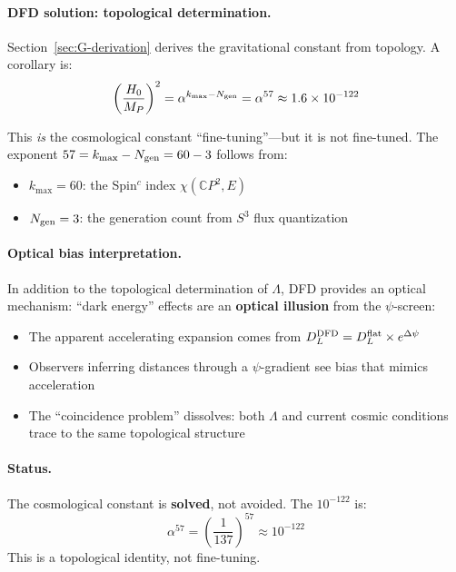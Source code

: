 \paragraph{DFD solution: topological determination.}
Section~\ref{sec:G-derivation} derives the gravitational constant from topology. A corollary is:
\begin{equation}
\left(\frac{H_0}{M_P}\right)^2 = \alpha^{k_{\max} - N_{\rm gen}} = \alpha^{57} \approx 1.6 \times 10^{-122}
\end{equation}

This \textit{is} the cosmological constant ``fine-tuning''---but it is not fine-tuned. The exponent $57 = k_{\max} - N_{\rm gen} = 60 - 3$ follows from:
\begin{itemize}
\item $k_{\max} = 60$: the Spin$^c$ index $\chi(\mathbb{C}P^2, E)$
\item $N_{\rm gen} = 3$: the generation count from $S^3$ flux quantization
\end{itemize}

\paragraph{Optical bias interpretation.}
In addition to the topological determination of $\Lambda$, DFD provides an optical mechanism: ``dark energy'' effects are an \textbf{optical illusion} from the $\psi$-screen:
\begin{itemize}
\item The apparent accelerating expansion comes from $D_L^{\rm DFD} = D_L^{\rm flat} \times e^{\Delta\psi}$
\item Observers inferring distances through a $\psi$-gradient see bias that mimics acceleration
\item The ``coincidence problem'' dissolves: both $\Lambda$ and current cosmic conditions trace to the same topological structure
\end{itemize}

\paragraph{Status.}
The cosmological constant is \textbf{solved}, not avoided. The $10^{-122}$ is:
\begin{equation}
\alpha^{57} = \left(\frac{1}{137}\right)^{57} \approx 10^{-122}
\end{equation}
This is a topological identity, not fine-tuning.

